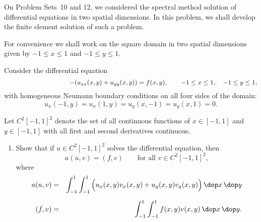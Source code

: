 On Problem Sets~10 and 12, we considered the spectral method solution of 
differential equations in two spatial dimensions.
In this problem, we shall develop the finite element solution
of such a problem.

For convenience we shall work on the square domain in two
spatial dimensions given by $-1\le x \le 1$ and $-1\le y \le 1$.

Consider the differential equation
\[ \hspace*{10em}-(u_{xx}(x,y) +u_{yy}(x,y)) = f(x,y),
   \qquad -1\le x \le 1, \quad -1\le y\le 1,\]
with homogeneous Neumann boundary conditions on all four sides of the domain:
\[ u_x(-1,y) = u_x(1,y) = u_y(x,-1)=u_y(x,1) = 0.\]

Let $C^2[-1,1]^2$ denote the set of all continuous functions 
of $x\in[-1,1]$ and $y\in[-1,1]$ 
with all first and second derivatives continuous.

\begin{enumerate}
\item Show that if $u\in C^2[-1,1]^2$ solves the differential equation, then 
\[  a(u,v) = (f,v) \qquad \mbox{for all $v \in C^2[-1,1]^2$},\]
where
\begin{eqnarray*}
   a(u,v) &=& \int_{-1}^1 \int_{-1}^1 
    \Big(u_x(x,y) v_x(x,y) + u_y(x,y)v_y(x,y)\Big)\,\dop x\,\dop y \\[.5em]
    (f,v) &=& \int_{-1}^1 \int_{-1}^1 f(x,y) v(x,y) \,\dop x\,\dop y.
\end{eqnarray*}
\end{enumerate}

